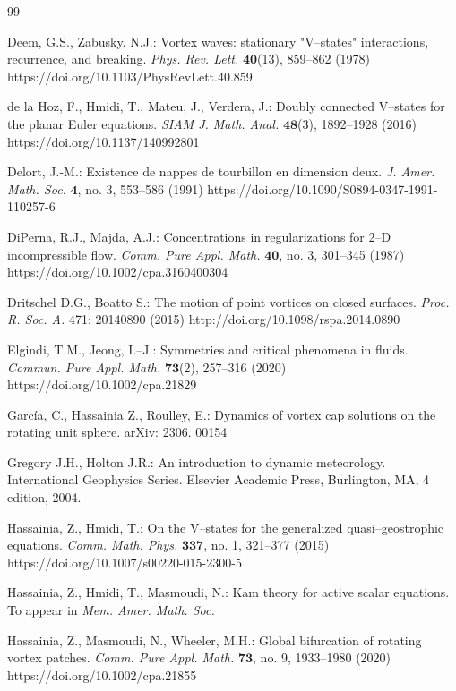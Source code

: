 \documentclass[12pt,reqno]{amsart}
\numberwithin{equation}{section}
\theoremstyle{definition}
\theoremstyle{remark}
\begin{document}
\begin{thebibliography}{99}
	
	Deem, G.S., Zabusky. N.J.: Vortex waves: stationary "V--states" interactions, recurrence, and breaking. \textit{Phys. Rev. Lett.} $\boldsymbol{40}$(13), 859--862 (1978) https://doi.org/10.1103/PhysRevLett.40.859
	
	de la Hoz, F., Hmidi, T., Mateu, J., Verdera, J.: Doubly connected V--states for the planar Euler equations. \textit{SIAM J. Math. Anal.} $\boldsymbol{48}$(3), 1892--1928 (2016) https://doi.org/10.1137/140992801
	
	Delort, J.-M.: Existence de nappes de tourbillon en dimension deux. \textit{J. Amer. Math. Soc.} $\boldsymbol{4}$, no. 3, 553--586 (1991) https://doi.org/10.1090/S0894-0347-1991-110257-6
	
	
	DiPerna, R.J., Majda, A.J.: Concentrations in regularizations for 2--D incompressible flow. \textit{Comm. Pure Appl. Math.} $\boldsymbol{40}$, no. 3, 301--345 (1987) https://doi.org/10.1002/cpa.3160400304
	
	Dritschel D.G., Boatto S.: The motion of point vortices on closed surfaces. \textit{Proc. R. Soc. A.} 471:
	20140890 (2015) http://doi.org/10.1098/rspa.2014.0890
	
	
	Elgindi, T.M., Jeong, I.--J.: Symmetries and critical phenomena in fluids. \textit{Commun. Pure Appl. Math.} $\boldsymbol{73}$(2), 257--316 (2020) https://doi.org/10.1002/cpa.21829
	
	
	Garc\'ia, C., Hassainia Z., Roulley, E.: Dynamics of vortex cap solutions on the rotating unit sphere. arXiv: 2306. 00154
	
	Gregory J.H., Holton J.R.: An introduction to dynamic meteorology. International Geophysics Series. Elsevier Academic Press, Burlington, MA, 4 edition, 2004.
	
	
	Hassainia, Z., Hmidi, T.: On the V--states for the generalized quasi--geostrophic equations.
	\textit{Comm. Math. Phys.} $\boldsymbol{337}$, no. 1, 321--377 (2015) https://doi.org/10.1007/s00220-015-2300-5
	
	Hassainia, Z., Hmidi, T., Masmoudi, N.: Kam theory for active scalar equations. To appear in \textit{Mem. Amer. Math. Soc.}
	
	
	Hassainia, Z., Masmoudi, N., Wheeler, M.H.: Global bifurcation of rotating vortex patches. \textit{Comm. Pure Appl. Math.} $\boldsymbol{73}$, no. 9, 1933--1980 (2020) https://doi.org/10.1002/cpa.21855
	

\end{thebibliography}
\end{document}
